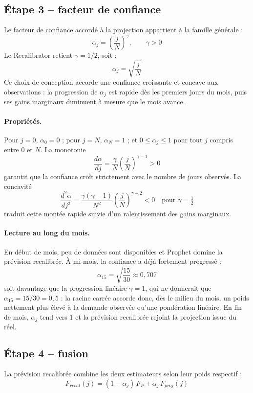 \documentclass[11pt,a4paper]{article}
\begin{document}
\subsection{Étape 3 -- facteur de confiance}

Le facteur de confiance accordé à la projection appartient à la famille générale :
\[
\alpha_j = \left(\frac{j}{N}\right)^{\gamma}, \qquad \gamma > 0
\]
Le Recalibrator retient \(\gamma = 1/2\), soit :
\[
\alpha_j = \sqrt{\frac{j}{N}}
\]
Ce choix de conception accorde une confiance croissante et concave aux observations : la progression de \(\alpha_j\) est rapide dès les premiers jours du mois, puis ses gains marginaux diminuent à mesure que le mois avance.

\paragraph{Propriétés.} Pour \(j=0\), \(\alpha_0=0\) ; pour \(j=N\), \(\alpha_N=1\) ; et \(0\le\alpha_j\le1\) pour tout \(j\) compris entre \(0\) et \(N\). La monotonie
\[
\frac{d\alpha}{dj} = \frac{\gamma}{N}\left(\frac{j}{N}\right)^{\gamma-1} > 0
\]
garantit que la confiance croît strictement avec le nombre de jours observés. La concavité
\[
\frac{d^2\alpha}{dj^2} = \frac{\gamma(\gamma-1)}{N^2}\left(\frac{j}{N}\right)^{\gamma-2} < 0 \quad \text{pour } \gamma=\tfrac12
\]
traduit cette montée rapide suivie d'un ralentissement des gains marginaux.

\paragraph{Lecture au long du mois.} En début de mois, peu de données sont disponibles et Prophet domine la prévision recalibrée. À mi-mois, la confiance a déjà fortement progressé :
\[
\alpha_{15} = \sqrt{\frac{15}{30}} \approx 0{,}707
\]
soit davantage que la progression linéaire \(\gamma=1\), qui ne donnerait que \(\alpha_{15}=15/30=0{,}5\) : la racine carrée accorde donc, dès le milieu du mois, un poids nettement plus élevé à la demande observée qu'une pondération linéaire. En fin de mois, \(\alpha_j\) tend vers 1 et la prévision recalibrée rejoint la projection issue du réel.

\subsection{Étape 4 -- fusion}

La prévision recalibrée combine les deux estimateurs selon leur poids respectif :
\[
F_{recal}(j) = (1-\alpha_j)\,F_P + \alpha_j\,F_{proj}(j)
\]
\end{document}
